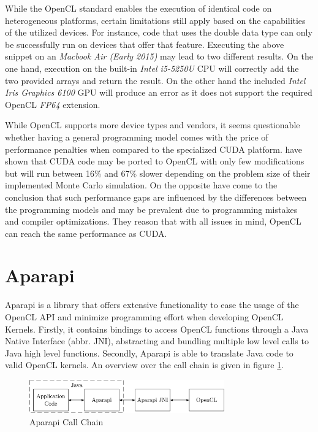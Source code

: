 While the OpenCL standard enables the execution of identical code on heterogeneous platforms, certain limitations still apply based on the capabilities of the utilized devices. For instance, code that uses the double data type can only be successfully run on devices that offer that feature. Executing the above snippet on an \textit{Macbook Air (Early 2015)} may lead to two different results. On the one hand, execution on the built-in \textit{Intel i5-5250U} CPU will correctly add the two provided arrays and return the result. On the other hand the included \textit{Intel Iris Graphics 6100} GPU will produce an error as it does not support the required OpenCL \textit{FP64} extension.

While OpenCL supports more device types and vendors, it seems questionable whether having a general programming model comes with the price of performance penalties when compared to the specialized CUDA platform. \citeauthor{performance_comparison} have shown that CUDA code may be ported to OpenCL with only few modifications but will run between 16\% and 67\% slower depending on the problem size of their implemented Monte Carlo simulation\cite{performance_comparison}. On the opposite \citeauthor{comprehensive_performance_comparison} have come to the conclusion that such performance gaps are influenced by the differences between the programming models and may be prevalent due to programming mistakes and compiler optimizations\cite{comprehensive_performance_comparison}. They reason that with all issues in mind, OpenCL can reach the same performance as CUDA.

\section{Aparapi}
\label{aparapi}
Aparapi is a library that offers extensive functionality to ease the usage of the OpenCL API and minimize programming effort when developing OpenCL Kernels\cite{aparapi}. Firstly, it contains bindings to access OpenCL functions through a Java Native Interface (abbr. JNI), abstracting and bundling multiple low level calls to Java high level functions. Secondly, Aparapi is able to translate Java code to valid OpenCL kernels. An overview over the call chain is given in figure \ref{img:aparapi_call_chain}.

\begin{figure}[!htb]
	\includegraphics[width=0.75\textwidth]{drawings/aparapi_call_chain.pdf}
	\centering
	\caption{Aparapi Call Chain}
	\label{img:aparapi_call_chain}
\end{figure}

